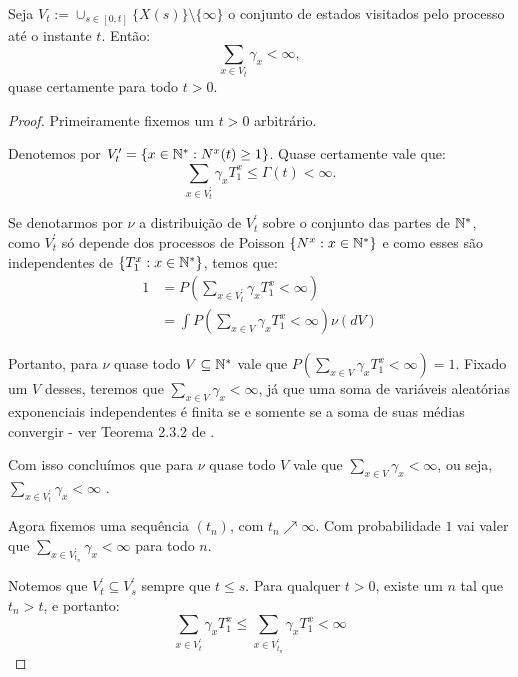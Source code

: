 \begin{proposicao}
  \label{prop:gamma-somavel}
  Seja $V_t := \cup_{s \in [0, t]} \{ X(s) \} \setminus \{\infty\}$ o
  conjunto de estados visitados pelo processo até o instante
  $t$. Então:
  \begin{displaymath}
    \sum_{x \in V_t} \gamma_x < \infty,
  \end{displaymath}
  quase certamente para todo $t > 0$.
\end{proposicao}
\begin{proof}

  Primeiramente fixemos um $t > 0$ arbitrário.

  Denotemos por $V^\prime_t = \{ x \in {\mathbb{N^*}}: N^x(t) \geq 1 \}$. Quase
  certamente vale que:
  \begin{displaymath}
    \sum_{x \in V^\prime_t} \gamma_x T^x_1 \leq \Gamma(t) < \infty.
  \end{displaymath}

  Se denotarmos por $\nu$ a distribuição de $V^\prime_t$ sobre o
  conjunto das partes de ${\mathbb{N^*}}$, como $V^\prime_t$ só depende dos
  processos de Poisson $\{N^x: x \in {\mathbb{N^*}}\}$ e como esses são
  independentes de $\{ T^x_1: x \in {\mathbb{N^*}} \}$, temos que:
  \begin{align*}
    1 &= P\left(\sum_{x \in V^\prime_t} \gamma_x T^x_1 < \infty
    \right)\\
    &=\int P\left(\sum_{x \in V} \gamma_x T^x_1 < \infty
    \right) \nu(dV)
  \end{align*}

  Portanto, para $\nu$ quase todo $V \subseteq {\mathbb{N^*}}$ vale que
  $P(\sum_{x \in V} \gamma_x T^x_1 < \infty) = 1$. Fixado um $V$
  desses, teremos que $\sum_{x \in V}\gamma_x < \infty$, já que uma
  soma de variáveis aleatórias exponenciais independentes é finita \qc
  se e somente se a soma de suas médias convergir - ver Teorema 2.3.2
  de \cite{norris:98}.

  Com isso concluímos que para $\nu$ quase todo $V$ vale que $\sum_{x
    \in V}\gamma_x < \infty$, ou seja, $\sum_{x \in
    V^\prime_t}\gamma_x < \infty$ \qc.

  Agora fixemos uma sequência $(t_n)$, com $t_n\nearrow
  \infty$. Com probabilidade $1$ vai valer que $\sum_{x \in
    V^\prime_{t_n}}\gamma_x < \infty$ para todo $n$.

  Notemos que $V^\prime_t \subseteq V^\prime_s$ sempre que $t \leq
  s$. Para qualquer $t > 0$, existe um $n$ tal que $t_n > t$, e
  portanto:
  \begin{displaymath}
    \sum_{x \in V^\prime_t}\gamma_x T^x_1 \leq
    \sum_{x \in V^\prime_{t_n}}\gamma_x T^x_1 < \infty
  \end{displaymath}


\end{proof}
